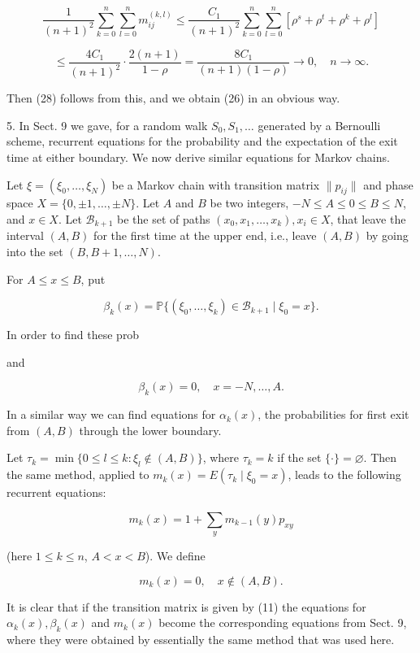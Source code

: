 $$\frac{1}{(n+1)^2} \sum_{k=0}^{n} \sum_{l=0}^{n} m_{ij}^{(k,l)} \leq \frac{C_1}{(n+1)^2} \sum_{k=0}^{n} \sum_{l=0}^{n} \left[ \rho^s + \rho^t + \rho^k + \rho^l \right]$$

$$\leq \frac{4C_1}{(n+1)^2} \cdot \frac{2(n+1)}{1-\rho} = \frac{8C_1}{(n+1)(1-\rho)} \rightarrow 0, \quad n \rightarrow \infty.$$

Then (28) follows from this, and we obtain (26) in an obvious way.

5. In Sect. 9 we gave, for a random walk $S_0, S_1, \ldots$ generated by a Bernoulli scheme, recurrent equations for the probability and the expectation of the exit time at either boundary. We now derive similar equations for Markov chains.

Let $\xi = (\xi_0, \ldots, \xi_N)$ be a Markov chain with transition matrix $\|p_{ij}\|$ and phase space $X = \{0, \pm 1, \ldots, \pm N\}$. Let $A$ and $B$ be two integers, $-N \leq A \leq 0 \leq B \leq N$, and $x \in X$. Let $\mathcal{B}_{k+1}$ be the set of paths $(x_0, x_1, \ldots, x_k), x_i \in X$, that leave the interval $(A, B)$ for the first time at the upper end, i.e., leave $(A, B)$ by going into the set $(B, B+1, \ldots, N)$.

For $A \leq x \leq B$, put

$$\beta_k(x) = \mathbb{P}\{(\xi_0, \ldots, \xi_k) \in \mathcal{B}_{k+1} \mid \xi_0 = x\}.$$

In order to find these prob

and

$$\beta_k(x) = 0, \quad x = -N, \ldots, A.$$

In a similar way we can find equations for $\alpha_k(x)$, the probabilities for first exit from $(A, B)$ through the lower boundary.

Let $\tau_k = \min\{0 \leq l \leq k : \xi_l \notin (A, B)\}$, where $\tau_k = k$ if the set $\{\cdot\} = \varnothing$. Then the same method, applied to $m_k(x) = E(\tau_k \mid \xi_0 = x)$, leads to the following recurrent equations:

$$m_k(x) = 1 + \sum_y m_{k-1}(y)p_{xy}$$

(here $1 \leq k \leq n$, $A < x < B$). We define

$$m_k(x) = 0, \quad x \notin (A, B).$$

It is clear that if the transition matrix is given by (11) the equations for $\alpha_k(x), \beta_k(x)$ and $m_k(x)$ become the corresponding equations from Sect. 9, where they were obtained by essentially the same method that was used here.

